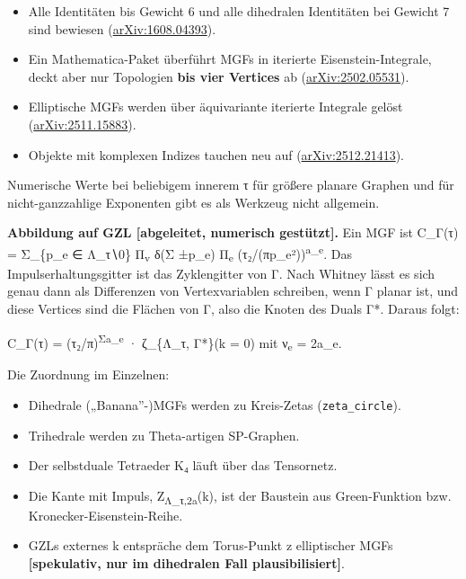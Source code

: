 \begin{itemize}
\tightlist
\item
  Alle Identitäten bis Gewicht 6 und alle dihedralen Identitäten bei Gewicht 7 sind bewiesen (\href{https://arxiv.org/abs/1608.04393}{arXiv:1608.04393}).
\item
  Ein Mathematica-Paket überführt MGFs in iterierte Eisenstein-Integrale, deckt aber nur Topologien \textbf{bis vier Vertices} ab (\href{https://arxiv.org/abs/2502.05531}{arXiv:2502.05531}).
\item
  Elliptische MGFs werden über äquivariante iterierte Integrale gelöst (\href{https://arxiv.org/abs/2511.15883}{arXiv:2511.15883}).
\item
  Objekte mit komplexen Indizes tauchen neu auf (\href{https://arxiv.org/abs/2512.21413}{arXiv:2512.21413}).
\end{itemize}

Numerische Werte bei beliebigem innerem τ für größere planare Graphen und für nicht-ganzzahlige Exponenten gibt es als Werkzeug nicht allgemein.

\textbf{Abbildung auf GZL {[}abgeleitet, numerisch gestützt{]}.} Ein MGF ist C\_Γ(τ) = Σ\_\{p\_e ∈ Λ\_τ∖0\} Π\textsubscript{v} δ(Σ ±p\_e) Π\textsubscript{e} (τ₂/(π\textbar p\_e\textbar²))\textsuperscript{a\_e}. Das Impulserhaltungsgitter ist das Zyklengitter von Γ. Nach Whitney lässt es sich genau dann als Differenzen von Vertexvariablen schreiben, wenn Γ planar ist, und diese Vertices sind die Flächen von Γ, also die Knoten des Duals Γ*. Daraus folgt:

C\_Γ(τ) = (τ₂/π)\textsuperscript{Σa\_e} · ζ\_\{Λ\_τ, Γ*\}(k = 0) mit ν\textsubscript{e} = 2a\_e.

Die Zuordnung im Einzelnen:

\begin{itemize}
\tightlist
\item
  Dihedrale („Banana''-)MGFs werden zu Kreis-Zetas (\texttt{zeta\_circle}).
\item
  Trihedrale werden zu Theta-artigen SP-Graphen.
\item
  Der selbstduale Tetraeder K₄ läuft über das Tensornetz.
\item
  Die Kante mit Impuls, Z\textsubscript{Λ\_τ,2a}(k), ist der Baustein aus Green-Funktion bzw. Kronecker-Eisenstein-Reihe.
\item
  GZLs externes k entspräche dem Torus-Punkt z elliptischer MGFs \textbf{{[}spekulativ, nur im dihedralen Fall plausibilisiert{]}}.
\end{itemize}


